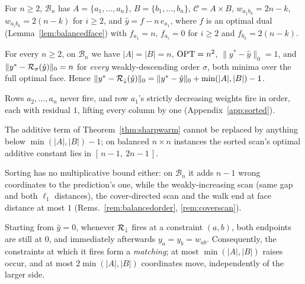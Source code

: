 \begin{definition}\label{def:balancedfam}
For $n \ge 2$, $\mathcal{B}_n$ has $A = \{a_1,\dots,a_n\}$, $B = \{b_1,\dots,b_n\}$,
$\mathcal{C} = A \times B$, $w_{a_1 b_k} = 2n-k$, $w_{a_i b_k} = 2(n-k)$ for $i \ge 2$, and
$\hat y = f - n\,e_{a_1}$, where $f$ is an optimal dual (Lemma~\ref{lem:balancedface}) with
$f_{a_1} = n$, $f_{a_i} = 0$ for $i \ge 2$ and $f_{b_k} = 2(n-k)$.
\end{definition}

\begin{theorem}\label{thm:balancedlb}
For every $n \ge 2$, on $\mathcal{B}_n$ we have $|A| = |B| = n$, $\mathrm{OPT} = n^2$,
$\|y^* - \hat y\|_0 = 1$, and $\|y^* - \mathcal{R}_{\sigma}(\hat y)\|_0 = n$ for \emph{every}
weakly-descending order $\sigma$, both minima over the full optimal face. Hence
$\|y^* - \mathcal{R}_{\downarrow}(\hat y)\|_0 = \|y^* - \hat y\|_0 + \min(|A|,|B|) - 1$.
\end{theorem}

Rows $a_2, \dots, a_n$ never fire, and row $a_1$'s strictly decreasing weights fire in order, each
with residual $1$, lifting every column by one (Appendix~\ref{app:sorted}).

\begin{corollary}\label{cor:noadditive}
The additive term of Theorem~\ref{thm:sharpwarm} cannot be replaced by anything below
$\min(|A|,|B|) - 1$; on balanced $n \times n$ instances the sorted scan's optimal additive constant
lies in $[\,n-1,\ 2n-1\,]$.
\end{corollary}

Sorting has no multiplicative bound either: on $\mathcal{B}_n$ it adds $n - 1$ wrong coordinates to
the prediction's one, while the weakly-increasing scan (same gap and both $\ell_1$ distances), the cover-directed
scan and the walk end at face distance at most $1$ (Rems.~\ref{rem:balancedorder},
\ref{rem:coverscan}).

\begin{proposition}\label{prop:sortedcold}
Starting from $\hat{y} = 0$, whenever $\mathcal{R}_\downarrow$ fires at a constraint $(a,b)$, both
endpoints are still at $0$, and immediately afterwards $y_a = y_b = w_{ab}$. Consequently, the
constraints at which it fires form a \emph{matching}; at most $\min(|A|,|B|)$ raises occur, and at
most $2\min(|A|,|B|)$ coordinates move, independently of the larger side.
\end{proposition}

